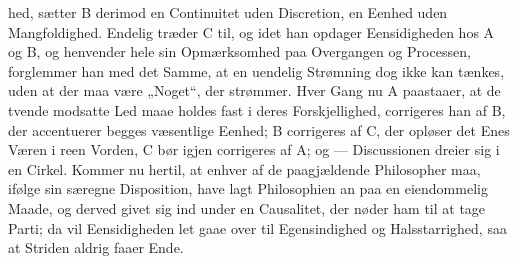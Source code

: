 \documentclass[12pt]{book}
\begin{document}
hed, sætter B derimod en Continuitet uden Discretion, en Eenhed uden Mangfoldighed.
Endelig træder C til, og idet han opdager Eensidigheden hos A og B, og henvender hele
sin Opmærksomhed paa Overgangen og Processen, forglemmer han med det Samme, at en
uendelig Strømning dog ikke kan tænkes, uden at der maa være „Noget“, der strømmer.
Hver Gang nu A paastaaer, at de tvende modsatte Led maae holdes fast i deres
Forskjellighed, corrigeres han af B, der accentuerer begges væsentlige Eenhed; B
corrigeres af C, der opløser det Enes Væren i reen Vorden, C bør igjen corrigeres af
A; og --- Discussionen dreier sig i en Cirkel. Kommer nu hertil, at enhver af de
paagjældende Philosopher maa, ifølge sin særegne Disposition, have lagt Philosophien
an paa en eiendommelig Maade, og derved givet sig ind under en Causalitet, der nøder
ham til at tage Parti; da vil Eensidigheden let gaae over til Egensindighed og
Halsstarrighed, saa at Striden aldrig faaer Ende.
\end{document}
